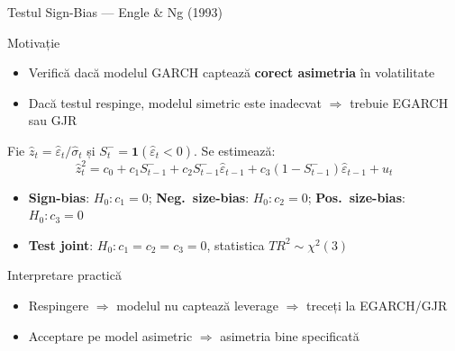 \documentclass[9pt, aspectratio=169, t]{beamer}
\begin{document}
\begin{frame}{Testul Sign-Bias --- Engle \& Ng (1993)}
    \small
        \begin{block}{Motivație}
            \begin{itemize}
                \item Verifică dacă modelul GARCH captează \textbf{corect asimetria} în volatilitate
                \item Dacă testul respinge, modelul simetric este inadecvat $\Rightarrow$ trebuie EGARCH sau GJR
            \end{itemize}
        \end{block}
        \vspace{-1mm}
        \begin{defn}
            Fie $\hat{z}_t = \hat{\varepsilon}_t / \hat{\sigma}_t$ și $S_t^- = \mathbf{1}(\hat{\varepsilon}_t < 0)$. Se estimează:
            \vspace{-2mm}
            \[
                \hat{z}_t^2 = c_0 + c_1 S_{t-1}^- + c_2 S_{t-1}^- \hat{\varepsilon}_{t-1} + c_3 (1 - S_{t-1}^-) \hat{\varepsilon}_{t-1} + u_t
            \]
            \vspace{-2mm}
            \begin{itemize}\setlength{\itemsep}{-1pt}
                \item \textbf{Sign-bias}: $H_0: c_1 = 0$; \; \textbf{Neg.\ size-bias}: $H_0: c_2 = 0$; \; \textbf{Pos.\ size-bias}: $H_0: c_3 = 0$
                \item \textbf{Test joint}: $H_0: c_1 = c_2 = c_3 = 0$, statistica $TR^2 \sim \chi^2(3)$
            \end{itemize}
        \end{defn}
        \vspace{-1mm}
        \begin{alertblock}{Interpretare practică}
            \begin{itemize}
                \item Respingere $\Rightarrow$ modelul nu captează leverage $\Rightarrow$ treceți la EGARCH/GJR
                \item Acceptare pe model asimetric $\Rightarrow$ asimetria bine specificată
            \end{itemize}
        \end{alertblock}
\end{frame}
\end{document}
